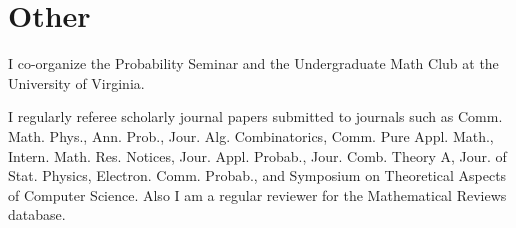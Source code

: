 \documentclass[letterpaper,11pt]{article}
\begin{document}
\section*{Other}

I co-organize the
Probability Seminar and the Undergraduate Math Club
at the University of Virginia.






\smallskip


I regularly referee scholarly journal papers
	submitted to journals such as Comm. Math. Phys., 
	Ann. Prob., Jour. Alg. Combinatorics,
	Comm. Pure Appl. Math.,
	Intern. Math. Res. Notices,
	Jour. Appl. Probab.,
	Jour. Comb. Theory A,
	Jour. of Stat. Physics,
	Electron. Comm. Probab.,
	and 
	Symposium on Theoretical Aspects of Computer Science.
	Also I am a regular reviewer for the
	Mathematical Reviews database.
\end{document}
